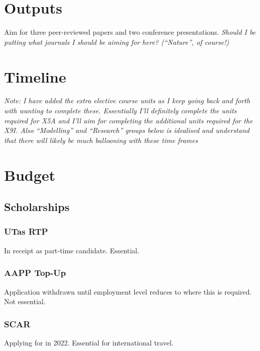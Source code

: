 \documentclass[11pt,a4paper]{article}
\begin{document}
\section*{Outputs}
%
Aim for three peer-reviewed papers and two conference presentations. \textit{Should I be putting what journals I should be aiming for here? (``Nature'', of course!)}
\section*{Timeline}
%
\textit{Note: I have added the extra elective course units as I keep going back and forth with wanting to complete these. Essentially I'll definitely complete the units required for X5A and I'll aim for completing the additional units required for the X9I. Also ``Modelling'' and ``Research'' groups below is idealised and understand that there will likely be much ballooning with these time frames}
\newpage
\begin{landscape}
\thispagestyle{empty}

\end{landscape}
\restoregeometry
\newpage
\section*{Budget}
%
\subsection{Scholarships}
\subsubsection{UTas RTP}
In receipt as part-time candidate. Essential.
\subsubsection{AAPP Top-Up}
Application withdrawn until employment level reduces to where this is required. Not essential.
\subsubsection{SCAR}
Applying for in 2022. Essential for international travel.
\end{document}

